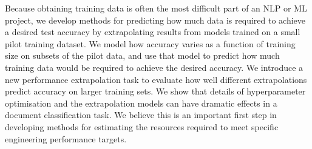 Because obtaining training data is often the most difficult part of an NLP or ML project, we develop methods for predicting how much data is required to achieve a desired test accuracy by extrapolating results from models trained on a small pilot training dataset.  We model how accuracy varies as a function of training size on subsets of the pilot data, and use that model to predict how much training data would be required to achieve the desired accuracy. We introduce a new performance extrapolation task to evaluate how well different extrapolations predict accuracy on larger training sets. We show that details of hyperparameter optimisation and the extrapolation models can have dramatic effects in a document classification task.  We believe this is an important first step in developing methods for estimating the resources required to meet specific engineering performance targets.
